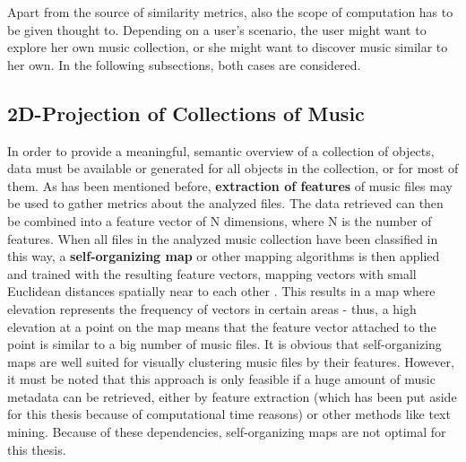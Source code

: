 Apart from the source of similarity metrics, also the scope of computation has to be given thought to. Depending on a user's scenario, the user might want to explore her own music collection, or she might want to discover music similar to her own. In the following subsections, both cases are considered.

\subsection{2D-Projection of Collections of Music}
\label{subsec:2dprojection}

In order to provide a meaningful, semantic overview of a collection of objects, data must be available or generated for all objects in the collection, or for most of them. 
As has been mentioned before, \textbf{extraction of features} of music files may be used to gather metrics about the analyzed files. The data retrieved can then be combined into a feature vector of N dimensions, where N is the number of features. When all files in the analyzed music collection have been classified in this way, a \textbf{self-organizing map} or other mapping algorithms is then applied and trained with the resulting feature vectors, mapping vectors with small Euclidean distances spatially near to each other \cite{RAU_02ismir}. This results in a map where elevation represents the frequency of vectors in certain areas - thus, a high elevation at a point on the map means that the feature vector attached to the point is similar to a big number of music files. It is obvious that self-organizing maps are well suited for visually clustering music files by their features. However, it must be noted that this approach is only feasible if a huge amount of music metadata 
can be retrieved, either by feature extraction (which has been put aside for this thesis because of computational time reasons) or other methods like text mining. Because of these dependencies, self-organizing maps are not optimal for this thesis. 


